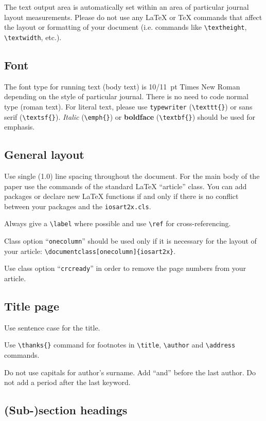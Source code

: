 \documentclass[bsi]{iosart2x}
\begin{document}
The text output area is automatically set within an area of particular journal layout measurements.
Please do not use any
\LaTeX{} or \TeX{} commands that affect the layout or formatting of
your document (i.e. commands like \verb|\textheight|,
\verb|\textwidth|, etc.).

\subsection{Font}

The font type for running text (body text) is 10/11~pt Times New Roman
depending on the style of particular journal.
There is no need to code normal type (roman text). For literal text, please use
\texttt{type\-writer} (\verb|\texttt{}|)
or \textsf{sans serif} (\verb|\textsf{}|). \emph{Italic} (\verb|\emph{}|)
or \textbf{boldface} (\verb|\textbf{}|) should be used for emphasis.


\subsection{General layout}

Use single (1.0) line spacing throughout the document. For the main
body of the paper use the commands of the standard \LaTeX{}
``article'' class. You can add packages or declare new \LaTeX{}
functions if and only if there is no conflict between your packages
and the \texttt{iosart2x.cls}.

Always give a \verb|\label| where possible and use \verb|\ref| for cross-referencing.

Class option ``\texttt{onecolumn}'' should be used only if it is
necessary for the layout of your article:\hfill\break
\verb|\documentclass[onecolumn]{iosart2x}|.

Use class option ``\texttt{crcready}'' in order to remove the page numbers from your article.


\subsection{Title page}

Use sentence case for the title.

Use \verb|\thanks{}| command for footnotes in \verb|\title|,
\verb|\author| and \verb|\address| commands.

Do not use capitals for author's surname. Add ``and'' before the last
author. Do not add a period after the last keyword.


\subsection{(Sub-)section headings}
\end{document}
